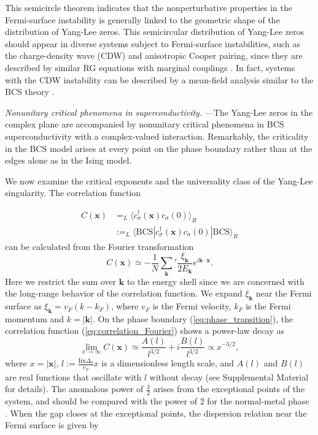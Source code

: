 \documentclass[aps,prl,twocolumn,superscriptaddress]{revtex4-1}
\begin{document}
\begin{bibunit}[apsrev4-2]
This semicircle theorem indicates that the nonperturbative properties in the Fermi-surface instability is generally linked to the geometric shape of the distribution of Yang-Lee zeros. This semicircular distribution of Yang-Lee zeros should appear in diverse systems subject to Fermi-surface instabilities, such as the charge-density wave (CDW) and anisotropic Cooper pairing,
since they are described by similar RG equations with
marginal couplings \cite{Shankar1994}. In fact, systems with the
CDW instability can be described by a mean-field analysis similar
to the BCS theory \cite{Gersch2005,PhysRevB.103.045142,PhysRevB.72.195106}. 

\emph{Nonunitary critical phenomena in superconductivity.} ---The
Yang-Lee zeros in the complex plane are accompanied by
nonunitary critical phenomena in BCS superconductivity
with a complex-valued interaction.  
Remarkably, the criticality in the BCS model arises at every point on the phase boundary rather than at the edges alone as in the Ising model.

We now examine the critical exponents and the universality class of the Yang-Lee singularity. The correlation function

\begin{align}
C(\bm{x}) & =_{L}\langle c_{\sigma}^{\dagger}(\bm{x})c_{\sigma}(0)\rangle_{R}\nonumber \\
 & :=_{L}\langle\text{BCS}|c_{\sigma}^{\dagger}(\bm{x})c_{\sigma}(0)|\text{BCS}\rangle_{R}
\end{align}
can be calculated from the Fourier transformation
\begin{equation}
C(\bm{x})\simeq-\frac{1}{N}\sum_{\bm{k}}^ {}{'}\frac{\xi_{\bm{k}}}{2E_{\bm{k}}}e^{i\bm{k}\cdot\bm{x}}.\label{eq:correlation_Fourier}
\end{equation}
Here we restrict the sum over $\bm{k}$ to the energy shell since
we are concerned with the long-range behavior of the correlation function.
We expand $\xi_{\bm{k}}$ near the Fermi surface as $\xi_{{\bm{k}}}=v_{F}(k-k_{F})$,
where $v_{F}$ is the Fermi velocity, $k_{F}$ is the Fermi momentum
and $k=|\bm{k}|$. On the phase boundary (\ref{eq:phase_transition}),
the correlation function (\ref{eq:correlation_Fourier}) shows a
power-law decay as 
\begin{equation}
\lim_{x\rightarrow\infty}C(\bm{x})\simeq\frac{A(l)}{l^{3/2}}+i\frac{B(l)}{l^{3/2}}\propto x^{-3/2},\label{correlation}
\end{equation}
where $x=|\bm{x}|$, $l:=\frac{\text{Im}\Delta_0}{v_{F}}x$ is a
dimensionless length scale, and $A(l)$ and $B(l)$ are real functions
that oscillate with $l$ without decay (see Supplemental Material
\cite{SupplementaryMaterial} for details). The anomalous power of
$\frac{3}{2}$ arises from the exceptional points of the system, and should be compared with the power of 2 for the normal-metal
phase \cite{Sachdev:2011uj}. When the gap closes at the exceptional points, the
dispersion relation near the Fermi surface is given by


\end{bibunit}
\end{document}
